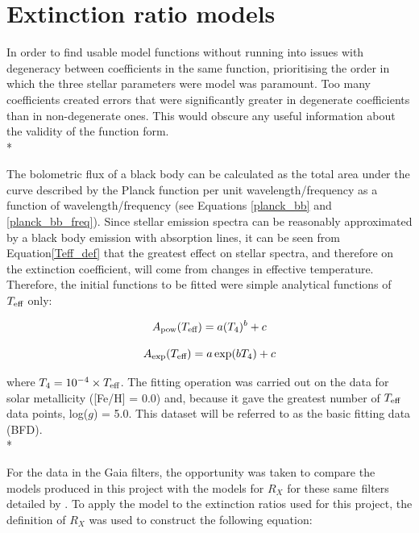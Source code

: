 \documentclass[12pt, a4paper]{report}
\begin{document}
\section{Extinction ratio models} \label{ext_models}

In order to find usable model functions without running into issues with degeneracy between coefficients in the same function, prioritising the order in which the three stellar parameters were model was paramount. Too many coefficients created errors that were significantly greater in degenerate coefficients than in non-degenerate ones. This would obscure any useful information about the validity of the function form.\\*

The bolometric flux of a black body can be calculated as the total area under the curve described by the Planck function per unit wavelength/frequency as a function of wavelength/frequency  (see Equations \ref{planck_bb} and \ref{planck_bb_freq}). Since stellar emission spectra can be reasonably approximated by a black body emission with absorption lines, it can be seen from Equation\ref{Teff_def} that the greatest effect on stellar spectra, and therefore on the extinction coefficient, will come from changes in effective temperature. Therefore, the initial functions to be fitted were simple analytical functions of $T_{\textnormal{eff}}$ only:

\begin{equation}
A_{\textnormal{pow}} (T_{\textnormal{eff}}) = a (T_{4})^{b} + c
\label{Teff_pow}
\end{equation}

\begin{equation}
A_{\textnormal{exp}} (T_{\textnormal{eff}}) = a \exp(b T_{4}) + c
\label{Teff_exp}
\end{equation}

where $T_{4} = 10^{-4} \times T_{\textnormal{eff}}$. The fitting operation was carried out on the data for solar metallicity ([Fe/H] = 0.0) and, because it gave the greatest number of $T_{\textnormal{eff}}$ data points, log($g$) = 5.0. This dataset will be referred to as the basic fitting data (BFD).\\*

For the data in the Gaia filters, the opportunity was taken to compare the models produced in this project with the models for $R_{X}$ for these same filters detailed by \cite{2018MNRAS.479L.102C}. To apply the \cite{2018MNRAS.479L.102C} model to the extinction ratios used for this project, the definition of $R_{X}$ was used to construct the following equation:
\end{document}
